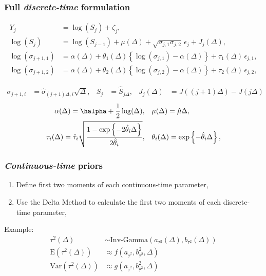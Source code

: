 \documentclass{beamer}
\begin{document}
\begin{frame}
  \frametitle{Full \textit{discrete-time} formulation}
  \begin{align}
    Y_j &= \log(S_j) + \zeta_j  ,   \label{eq:mod1}   \\
    \log(S_{j}) &= \log(S_{j-1}) + \mu(\Delta) + \sqrt{\sigma_{j,1}\sigma_{j,2}} \, \epsilon_{j} + J_j(\Delta)   ,  \label{eq:mod2}  \\
    \log(\sigma_{j+1,1}) &= \alpha(\Delta) + \theta_1(\Delta) \left\{ \log(\sigma_{j,1}) - \alpha(\Delta) \right\} + \tau_1(\Delta) \, \epsilon_{j,1}    ,  \label{eq:mod3}  \\
    \log(\sigma_{j+1,2}) &= \alpha(\Delta) + \theta_2(\Delta) \left\{ \log(\sigma_{j,2}) - \alpha(\Delta) \right\} + \tau_2(\Delta) \, \epsilon_{j,2}    , \label{eq:mod4}
  \end{align}

  \begin{align}
  \sigma_{j+1,i} &= \hat{\sigma}_{(j+1)\Delta,i}\sqrt{\Delta}, & S_j &= \hat{S}_{j\Delta}, & J_j(\Delta) &= J((j+1)\Delta) - J(j\Delta)
\end{align}
\begin{align}
  \label{eq:mu_sigma_tau}
  \begin{split}
    \alpha(\Delta) = \halpha + \frac{1}{2}\log(\Delta),\quad  & 
    \mu(\Delta) = \hat{\mu} \Delta,      \\
   \tau_i(\Delta) = \hat{\tau}_i \sqrt{ \frac{1 - \exp \left\{
          -2\hat{\theta}_i \Delta \right\}}{2\hat{\theta}_i } },\quad & \theta_i(\Delta) =
    \exp\left\{
      -\hat{\theta}_i \Delta \right\} ,
    \end{split}
\end{align}
\end{frame}
\begin{frame}
  \frametitle{\textit{Continuous-time} priors}
  \begin{enumerate}
  \item Define first two moments of each continuous-time parameter,
  \item Use the Delta Method to calculate the first two moments of each discrete-time parameter,
  \end{enumerate}
  Example:
  \begin{align}
    \tau^2(\Delta) &\sim \mbox{Inv-Gamma}\left(  a_{\tau^2}(\Delta), b_{\tau^2}(\Delta) \right) \\
    \mbox{E}(\tau^2(\Delta)) &\approx f(a_{\hat{\tau}^2}, b^2_{\hat{\tau}^2}, \Delta) \\
    \mbox{Var}(\tau^2(\Delta)) &\approx g(a_{\hat{\tau}^2}, b^2_{\hat{\tau}^2}, \Delta)
  \end{align}
\end{frame}
\end{document}
